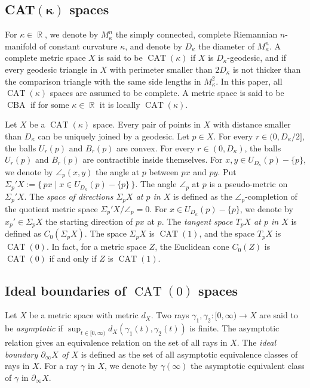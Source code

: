 \documentclass[a4paper,12pt]{amsart}
\newcommand{\CAT}{\operatorname{CAT}}
\newcommand{\CBA}{\operatorname{CBA}}
\newcommand{\R}{\operatorname{\mathbb{R}}}
\numberwithin{equation}{section}
\theoremstyle{plain}
\theoremstyle{definition}
\theoremstyle{remark}
\begin{document}
\subsection{CAT$\boldsymbol{(\kappa)}$ spaces}

For $\kappa \in \R$,
we denote by $M_{\kappa}^n$ 
the simply connected, complete Riemannian $n$-manifold 
of constant curvature $\kappa$,
and denote by $D_{\kappa}$ the diameter of $M_{\kappa}^n$.
A complete metric space $X$ is said to be 
$\CAT(\kappa)$
if $X$ is $D_{\kappa}$-geodesic,
and if every geodesic triangle in $X$ with perimeter 
smaller than $2D_{\kappa}$
is not thicker than the comparison triangle 
with the same side lengths in $M_{\kappa}^2$.
In this paper,
all $\CAT(\kappa)$ spaces are assumed to be complete.
A metric space is said to be $\CBA$
if for some $\kappa \in \R$
it is locally $\CAT(\kappa)$.

Let $X$ be a $\CAT(\kappa)$ space.
Every pair of points in $X$ with distance smaller than $D_{\kappa}$
can be uniquely joined by a geodesic.
Let $p \in X$.
For every $r \in (0,D_{\kappa}/2]$,
the balls $U_r(p)$ and $B_r(p)$ are convex.
For every $r \in (0,D_{\kappa})$,
the balls $U_r(p)$ and $B_r(p)$ are contractible inside themselves.
For $x, y \in U_{D_{\kappa}}(p) - \{p\}$,
we denote by $\angle_p(x,y)$
the angle at $p$
between $px$ and $py$.
Put $\Sigma_p'X := \{ \, px \mid x \in U_{D_{\kappa}}(p) - \{p\} \, \}$.
The angle $\angle_p$ at $p$
is a pseudo-metric on $\Sigma_p'X$.
The 
\emph{space of directions $\Sigma_pX$ at $p$ in $X$}
is defined as the $\angle_p$-completion of
the quotient metric space $\Sigma_p'X / \angle_p = 0$.
For $x \in U_{D_{\kappa}}(p) - \{p\}$,
we denote by $x_p' \in \Sigma_pX$
the starting direction of $px$ at $p$.
The 
\emph{tangent space $T_pX$ at $p$ in $X$} 
is defined as $C_0(\Sigma_pX)$.
The space $\Sigma_pX$ is $\CAT(1)$,
and the space $T_pX$ is $\CAT(0)$.
In fact,
for a metric space $Z$,
the Euclidean cone $C_0(Z)$ 
is $\CAT(0)$ if and only if $Z$ is $\CAT(1)$.

\subsection{Ideal boundaries of \boldmath$\CAT(0)$ spaces}

Let $X$ be a metric space with metric $d_X$.
Two rays $\gamma_1, \gamma_2 \colon [0,\infty) \to X$
are said to be
\emph{asymptotic}
if $\sup_{t \in [0,\infty)} d_X(\gamma_1(t),\gamma_2(t))$
is finite.
The asymptotic relation gives an equivalence relation
on the set of all rays in $X$.
The 
\emph{ideal boundary $\partial_{\infty}X$ of $X$}
is defined as the set of all asymptotic equivalence classes of rays in $X$.
For a ray $\gamma$ in $X$,
we denote by $\gamma(\infty)$
the asymptotic equivalent class of $\gamma$ in $\partial_{\infty}X$.
\end{document}
